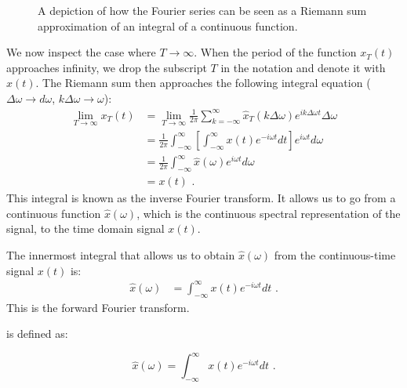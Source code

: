 \begin{figure}
\begin{center}
  \end{center}
  \caption{A depiction of how the Fourier series can be seen as a Riemann sum approximation of an integral of a continuous function.}
\end{figure}

We now inspect the case where $T\rightarrow \infty$. When the period of the
function $x_{T}(t)$ approaches infinity,
we drop the subscript $T$ in the notation and denote it with $x(t)$.
The Riemann sum then approaches the following integral
equation ($\Delta\omega \rightarrow d\omega$, $k\Delta\omega \rightarrow \omega$):
\begin{align}
  \lim_{T\rightarrow \infty} x_{T}(t) & = \lim_{T\rightarrow \infty}\frac{1}{2\pi} \sum_{k=-\infty}^{\infty} \hat{x}_{T}(k\Delta \omega) e^{ik\Delta \omega t}\Delta\omega \\
                                      & =\frac{1}{2\pi}\int_{-\infty}^{\infty} \left[\int_{-\infty}^{\infty} x(t) e^{-i\omega t} dt\right] e^{i\omega t}d\omega            \\
                                      & = \frac{1}{2\pi} \int_{-\infty}^{\infty} \hat{x}(\omega) e^{i\omega t}d\omega                                                      \\
                                      & = x(t) \,\,.
\end{align}
This integral is known as the inverse Fourier transform. It allows us to go from a continuous function $\hat{x}(\omega)$,
which is the continuous spectral representation of the signal, to the time domain signal $x(t)$.

The innermost integral that allows us to obtain $\hat{x}(\omega)$ from the continuous-time signal $x(t)$ is:
\begin{align}
  \hat{x}(\omega) & = \int_{-\infty}^{\infty} x(t) e^{-i\omega t} dt \,\,.
\end{align}
This is the forward Fourier transform.

 is defined as:

\begin{equation}
  \boxed{
    \hat{x}(\omega) = \int_{-\infty}^{\infty} x(t) e^{-i\omega t}dt
  } \,\,.
\end{equation}

